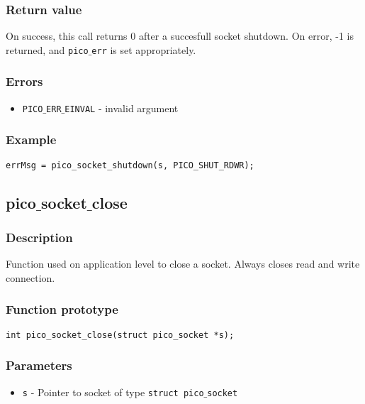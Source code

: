 \subsubsection*{Return value}
On success, this call returns 0 after a succesfull socket shutdown.
On error, -1 is returned, and \texttt{pico$\_$err} is set appropriately.

\subsubsection*{Errors}
\begin{itemize}[noitemsep]
\item \texttt{PICO$\_$ERR$\_$EINVAL} - invalid argument
\end{itemize}

\subsubsection*{Example}
\begin{verbatim}
errMsg = pico_socket_shutdown(s, PICO_SHUT_RDWR);
\end{verbatim}


\subsection{pico$\_$socket$\_$close}

\subsubsection*{Description}
Function used on application level to close a socket. Always closes read and write connection.

\subsubsection*{Function prototype}
\begin{verbatim}
int pico_socket_close(struct pico_socket *s);
\end{verbatim}


\subsubsection*{Parameters}
\begin{itemize}[noitemsep]
\item \texttt{s} - Pointer to socket of type \texttt{struct pico$\_$socket}
\end{itemize}

